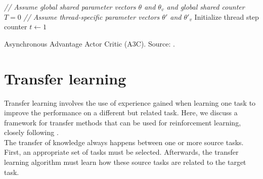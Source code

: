 \documentclass[a4paper]{article}
\begin{document}
\begin{algorithm}[H]
\DontPrintSemicolon
\emph{// Assume global shared parameter vectors $\theta$ and $\theta_v$ and global shared counter $T=0$}\;
\emph{// Assume thread-specific parameter vectors $\theta'$ and $\theta'_v$}\;
Initialize thread step counter $t\gets 1$\;
\caption{Asynchronous Advantage Actor Critic (A3C). Source: \cite{Mnih2016AsynchronousLearning}.}
\end{algorithm}

\section{Transfer learning}
Transfer learning involves the use of experience gained when learning one task to improve the performance on a different but related task. Here, we discuss a framework for transfer methods that can be used for reinforcement learning, closely following \cite{Taylor2009TransferSurvey}.\\

The transfer of knowledge always happens between one or more source tasks. First, an appropriate set of tasks must be selected. Afterwards, the transfer learning algorithm must learn how these source tasks are related to the target task.\\
\end{document}
